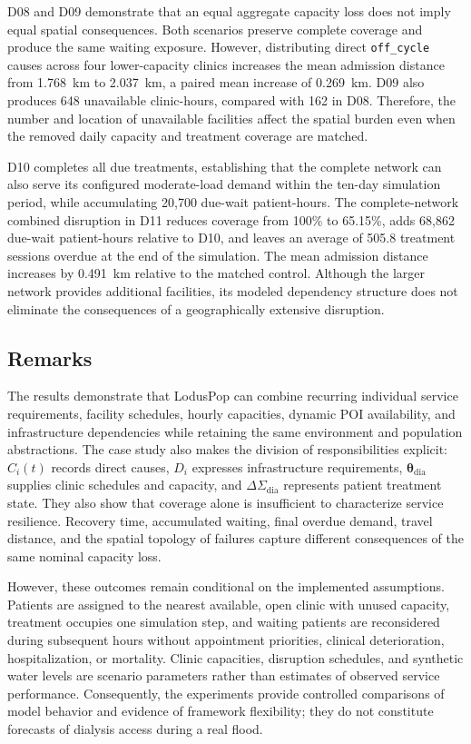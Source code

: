 D08 and D09 demonstrate that an equal aggregate capacity loss does not imply equal spatial consequences. Both scenarios preserve complete coverage and produce the same waiting exposure. However, distributing direct \texttt{off\_cycle} causes across four lower-capacity clinics increases the mean admission distance from 1.768~km to 2.037~km, a paired mean increase of 0.269~km. D09 also produces 648 unavailable clinic-hours, compared with 162 in D08. Therefore, the number and location of unavailable facilities affect the spatial burden even when the removed daily capacity and treatment coverage are matched.

D10 completes all due treatments, establishing that the complete network can also serve its configured moderate-load demand within the ten-day simulation period, while accumulating 20,700 due-wait patient-hours. The complete-network combined disruption in D11 reduces coverage from 100\% to 65.15\%, adds 68,862 due-wait patient-hours relative to D10, and leaves an average of 505.8 treatment sessions overdue at the end of the simulation. The mean admission distance increases by 0.491~km relative to the matched control. Although the larger network provides additional facilities, its modeled dependency structure does not eliminate the consequences of a geographically extensive disruption.


\subsection{Remarks}

The results demonstrate that LodusPop can combine recurring individual service requirements, facility schedules, hourly capacities, dynamic POI availability, and infrastructure dependencies while retaining the same environment and population abstractions. The case study also makes the division of responsibilities explicit: $C_i(t)$ records direct causes, $D_i$ expresses infrastructure requirements, $\bm{\theta}_{\mathrm{dia}}$ supplies clinic schedules and capacity, and $\Delta\Sigma_{\mathrm{dia}}$ represents patient treatment state. They also show that coverage alone is insufficient to characterize service resilience. Recovery time, accumulated waiting, final overdue demand, travel distance, and the spatial topology of failures capture different consequences of the same nominal capacity loss.

However, these outcomes remain conditional on the implemented assumptions. Patients are assigned to the nearest available, open clinic with unused capacity, treatment occupies one simulation step, and waiting patients are reconsidered during subsequent hours without appointment priorities, clinical deterioration, hospitalization, or mortality. Clinic capacities, disruption schedules, and synthetic water levels are scenario parameters rather than estimates of observed service performance. Consequently, the experiments provide controlled comparisons of model behavior and evidence of framework flexibility; they do not constitute forecasts of dialysis access during a real flood.
